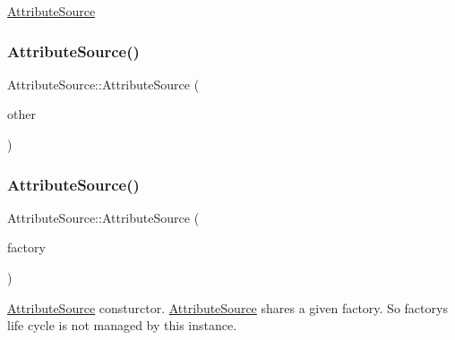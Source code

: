 \mbox{\hyperlink{classlucene_1_1core_1_1util_1_1AttributeSource}{Attribute\+Source}} \mbox{\label{classlucene_1_1core_1_1util_1_1AttributeSource_a46285603ecad877610be674c124fd632}} 
\subsubsection{\texorpdfstring{Attribute\+Source()}{AttributeSource()}\hspace{0.1cm}{\footnotesize\ttfamily [2/3]}}
{\footnotesize\ttfamily Attribute\+Source\+::\+Attribute\+Source (\begin{DoxyParamCaption}\item[{const \mbox{\hyperlink{classlucene_1_1core_1_1util_1_1AttributeSource}{Attribute\+Source}} \&}]{other }\end{DoxyParamCaption})}

\mbox{\label{classlucene_1_1core_1_1util_1_1AttributeSource_a3111b8c073c694240c1797420c7031a3}} 
\subsubsection{\texorpdfstring{Attribute\+Source()}{AttributeSource()}\hspace{0.1cm}{\footnotesize\ttfamily [3/3]}}
{\footnotesize\ttfamily Attribute\+Source\+::\+Attribute\+Source (\begin{DoxyParamCaption}\item[{\mbox{\hyperlink{classlucene_1_1core_1_1util_1_1AttributeFactory}{Attribute\+Factory}} \&}]{factory }\end{DoxyParamCaption})\hspace{0.3cm}{\ttfamily [explicit]}}

\mbox{\hyperlink{classlucene_1_1core_1_1util_1_1AttributeSource}{Attribute\+Source}} consturctor. \mbox{\hyperlink{classlucene_1_1core_1_1util_1_1AttributeSource}{Attribute\+Source}} shares a given factory. So factory\textquotesingle{}s life cycle is not managed by this instance. 

